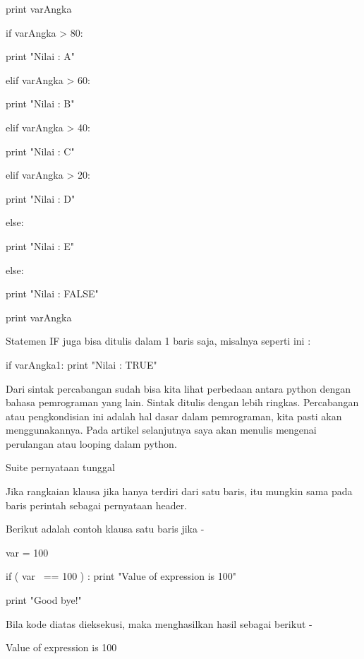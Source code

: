  
                       print varAngka 

 
                       if varAngka > 80: 

 
                                                print "Nilai : A" 

 
                       elif varAngka > 60: 

 
                                                print "Nilai : B" 

 
                       elif varAngka > 40: 

 
                                                print "Nilai : C" 

 
                       elif varAngka > 20: 

 
                                                print "Nilai : D" 

 
                       else: 

 
                                                print "Nilai : E" 

 
else: 

 
                       print "Nilai : FALSE" 

 
                       print varAngka 

 
Statemen IF juga bisa ditulis dalam 1 baris saja, misalnya seperti ini :  

 
if varAngka1: print "Nilai : TRUE" 

 
Dari sintak percabangan sudah bisa kita lihat perbedaan antara python dengan bahasa pemrograman yang lain. Sintak ditulis dengan lebih ringkas. Percabangan atau pengkondisian ini adalah hal dasar dalam pemrograman, kita pasti akan menggunakannya. Pada artikel selanjutnya saya akan menulis mengenai perulangan atau looping dalam python. 

 
Suite pernyataan tunggal 

 
Jika rangkaian   klausa   jika   hanya terdiri dari satu baris, itu mungkin sama pada baris perintah sebagai pernyataan header. 

 
Berikut adalah contoh   klausa   satu baris jika   - 


 
var = 100 

 
if ( var~ == 100 ) : print "Value of expression is 100" 

 
print "Good bye!" 

 
Bila kode diatas dieksekusi, maka menghasilkan hasil sebagai berikut - 

 
Value of expression is 100 

